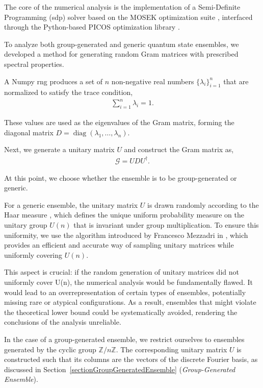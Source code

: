\documentclass[12pt,letterpaper]{article}
\begin{document}
The core of the numerical analysis is the implementation of a Semi-Definite Programming (\gls{sdp}) solver based on the MOSEK optimization suite \cite{mosek_sdp}, interfaced through the Python-based PICOS optimization library \cite{PICOS}. 

To analyze both group-generated and generic quantum state ensembles, we developed a method for generating random Gram matrices with prescribed spectral properties.

A Numpy \gls{rng}\cite{numpyRNG} produces a set of $n$ non-negative real numbers $\{\lambda_i\}_{i=1}^n$ that are normalized to satisfy the trace condition,
\begin{align*}
	\sum_{i=1}^n \lambda_i = 1.
\end{align*}

These values are used as the eigenvalues of the Gram matrix, forming the diagonal matrix $D = \operatorname{diag}(\lambda_1, \dots, \lambda_n)$. 

Next, we generate a unitary matrix $U$ and construct the Gram matrix as,
\begin{align*}
	\mathcal{G} = U D U^\dagger.
\end{align*}

At this point, we choose whether the ensemble is to be group-generated or generic.

For a generic ensemble, the unitary matrix $U$ is drawn randomly according to the Haar measure \cite{haarMeasure}, which defines the unique uniform probability measure on the unitary group $U(n)$ that is invariant under group multiplication. To ensure this uniformity, we use the algorithm introduced by Francesco Mezzadri in \cite{UnitaryMatricesGeneration}, which provides an efficient and accurate way of sampling unitary matrices while uniformly covering $U(n)$. 

This aspect is crucial: if the random generation of unitary matrices did not uniformly cover U(n), the numerical analysis would be fundamentally flawed. It would lead to an overrepresentation of certain types of ensembles, potentially missing rare or atypical configurations. As a result, ensembles that might violate the theoretical lower bound could be systematically avoided, rendering the conclusions of the analysis unreliable.

In the case of a group-generated ensemble, we restrict ourselves to ensembles generated by the cyclic group $\mathbb{Z}/n\mathbb{Z}$. The corresponding unitary matrix $U$ is constructed such that its columns are the vectors of the discrete Fourier basis, as discussed in Section~\ref{sectionGroupGeneratedEnsemble} (\emph{Group-Generated Ensemble}).
\end{document}
